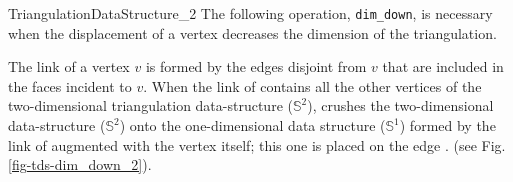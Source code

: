 \begin{ccRefConcept}{TriangulationDataStructure_2}
\newpage
The following operation, \texttt{dim\_down}, is necessary when the displacement of a vertex decreases the dimension of the triangulation.

{The link of a vertex $v$ is formed by the edges disjoint from $v$
that are included in the faces incident to $v$.
When the link of  contains all the other vertices
of the two-dimensional triangulation data-structure ($\mathbb{S}^2$),  crushes the two-dimensional 
data-structure ($\mathbb{S}^2$) onto the one-dimensional data structure ($\mathbb{S}^1$) formed by the link of 
augmented with the vertex  itself; this one is placed on the edge .
(see Fig. \ref{fig-tds-dim_down_2}).
}


\end{ccRefConcept}

